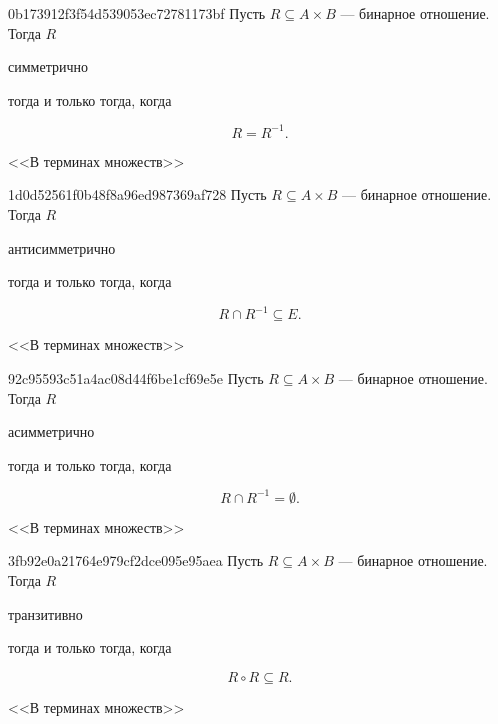 \begin{note}{0b173912f3f54d539053ec72781173bf}
    Пусть \({ R \subseteq A \times B }\) --- бинарное отношение.
    Тогда \({ R }\) \begin{icloze}{2}симметрично\end{icloze} тогда и только тогда, когда
    \begin{icloze}{1}
        \[
            R = R^{-1}.
        \]
    \end{icloze}

    \begin{center}
        \tiny
        <<В терминах множеств>>
    \end{center}
\end{note}

\begin{note}{1d0d52561f0b48f8a96ed987369af728}
    Пусть \({ R \subseteq A \times B }\) --- бинарное отношение.
    Тогда \({ R }\) \begin{icloze}{2}антисимметрично\end{icloze} тогда и только тогда, когда
    \begin{icloze}{1}
        \[
            R \cap R^{-1} \subseteq E.
        \]
    \end{icloze}

    \begin{center}
        \tiny
        <<В терминах множеств>>
    \end{center}
\end{note}

\begin{note}{92c95593c51a4ac08d44f6be1cf69e5e}
    Пусть \({ R \subseteq A \times B }\) --- бинарное отношение.
    Тогда \({ R }\) \begin{icloze}{2}асимметрично\end{icloze} тогда и только тогда, когда
    \begin{icloze}{1}
        \[
            R \cap R^{-1} = \emptyset.
        \]
    \end{icloze}

    \begin{center}
        \tiny
        <<В терминах множеств>>
    \end{center}
\end{note}

\begin{note}{3fb92e0a21764e979cf2dce095e95aea}
    Пусть \({ R \subseteq A \times B }\) --- бинарное отношение.
    Тогда \({ R }\) \begin{icloze}{2}транзитивно\end{icloze} тогда и только тогда, когда
    \begin{icloze}{1}
        \[
            R \circ R \subseteq R.
        \]
    \end{icloze}

    \begin{center}
        \tiny
        <<В терминах множеств>>
    \end{center}
\end{note}


